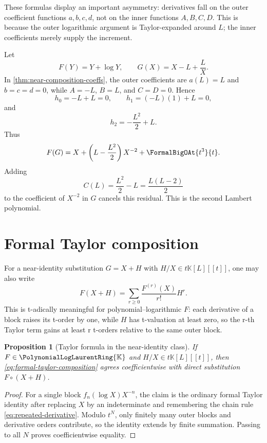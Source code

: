 \documentclass[11pt,openany]{book}
\theoremstyle{definition}
\theoremstyle{plain}
\newtheorem{proposition}{Proposition}[chapter]
\theoremstyle{remark}
\newcommand{\K}{\mathbb{K}}
\newcommand{\compose}{\mathbin{\circ}}
\begin{document}
These formulas display an important asymmetry: derivatives fall on the outer
coefficient functions \(a,b,c,d\), not on the inner functions \(A,B,C,D\).
This is because the outer logarithmic argument is Taylor-expanded around
\(L\); the inner coefficients merely supply the increment.

\begin{workedbox}[title={One step toward Lambert \(W\)}]
Let
\[
 F(Y)=Y+\log Y,
 \qquad
 G(X)=X-L+\frac{L}{X}.
\]
In \cref{thm:near-composition-coeffs}, the outer coefficients are
\(a(L)=L\) and \(b=c=d=0\), while \(A=-L\), \(B=L\), and \(C=D=0\).  Hence
\[
 h_0=-L+L=0,
 \qquad
 h_1=(-L)(1)+L=0,
\]
and
\[
 h_2=-\frac{L^2}{2}+L.
\]
Thus
\[
 F(G)=X+\left(L-\frac{L^2}{2}\right)X^{-2}+\FormalBigOAt{t^3}{t}.
\]
Adding
\[
 C(L)=\frac{L^2}{2}-L=\frac{L(L-2)}2
\]
to the coefficient of \(X^{-2}\) in \(G\) cancels this residual.  This is the
second Lambert polynomial.
\end{workedbox}

\section{Formal Taylor composition}
For a near-identity substitution \(G=X+H\) with \(H/X\in t\K[L][[t]]\), one
may also write
\begin{equation}\label{eq:formal-taylor-composition}
 F(X+H)=\sum_{r\ge0}\frac{F^{(r)}(X)}{r!}H^r.
\end{equation}
This is t-adically meaningful for polynomial--logarithmic \(F\): each
derivative of a block raises its t-order by one, while \(H\) has t-valuation at
least zero, so the r-th Taylor term gains at least r t-orders relative to the
same outer block.

\begin{proposition}[Taylor formula in the near-identity class]\label{prop:taylor-composition}
If \(F\in\PolynomialLogLaurentRing{\K}\) and \(H/X\in t\K[L][[t]]\), then
\cref{eq:formal-taylor-composition} agrees coefficientwise with direct
substitution \(F\compose(X+H)\).
\end{proposition}
\begin{proof}
For a single block \(f_n(\log X)X^{-n}\), the claim is the ordinary formal
Taylor identity after replacing \(X\) by an indeterminate and remembering the
chain rule \cref{eq:repeated-derivative}.  Modulo \(t^N\), only finitely many
outer blocks and derivative orders contribute, so the identity extends by
finite summation.  Passing to all \(N\) proves coefficientwise equality.
\end{proof}
\end{document}
